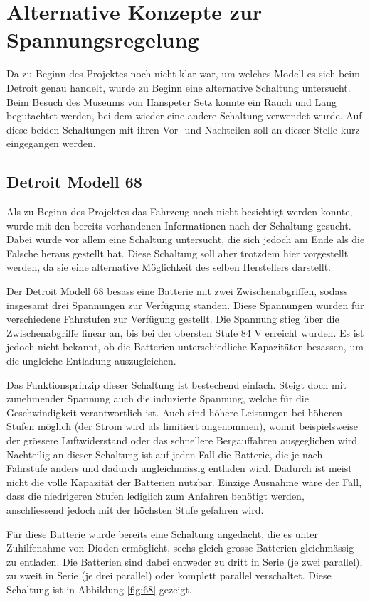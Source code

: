 \section{Alternative Konzepte zur Spannungsregelung}
Da zu Beginn des Projektes noch nicht klar war, um welches Modell es sich beim Detroit genau handelt, wurde zu Beginn eine alternative Schaltung untersucht. Beim Besuch des Museums von Hanspeter Setz konnte ein Rauch und Lang begutachtet werden, bei dem wieder eine andere Schaltung verwendet wurde. Auf diese beiden Schaltungen mit ihren Vor- und Nachteilen soll an dieser Stelle kurz eingegangen werden.

\subsection{Detroit Modell 68}
Als zu Beginn des Projektes das Fahrzeug noch nicht besichtigt werden konnte, wurde mit den bereits vorhandenen Informationen nach der Schaltung gesucht. Dabei wurde vor allem eine Schaltung untersucht, die sich jedoch am Ende als die Falsche heraus gestellt hat. Diese Schaltung soll aber trotzdem hier vorgestellt werden, da sie eine alternative Möglichkeit des selben Herstellers darstellt.

Der Detroit Modell 68 besass eine Batterie mit zwei Zwischenabgriffen, sodass insgesamt drei Spannungen zur Verfügung standen. Diese Spannungen wurden für verschiedene Fahrstufen zur Verfügung gestellt. Die Spannung stieg über die Zwischenabgriffe linear an, bis bei der obersten Stufe $84$ V erreicht wurden. Es ist jedoch nicht bekannt, ob die Batterien unterschiedliche Kapazitäten besassen, um die ungleiche Entladung auszugleichen.

Das Funktionsprinzip dieser Schaltung ist bestechend einfach. Steigt doch mit zunehmender Spannung auch die induzierte Spannung, welche für die Geschwindigkeit verantwortlich ist. Auch sind höhere Leistungen bei höheren Stufen möglich (der Strom wird als limitiert angenommen), womit beispielsweise der grössere Luftwiderstand oder das schnellere Bergauffahren ausgeglichen wird. Nachteilig an dieser Schaltung ist auf jeden Fall die Batterie, die je nach Fahrstufe anders und dadurch ungleichmässig entladen wird. Dadurch ist meist nicht die volle Kapazität der Batterien nutzbar. Einzige Ausnahme wäre der Fall, dass die niedrigeren Stufen lediglich zum Anfahren benötigt werden, anschliessend jedoch mit der höchsten Stufe gefahren wird.

Für diese Batterie wurde bereits eine Schaltung angedacht, die es unter Zuhilfenahme von Dioden ermöglicht, sechs gleich grosse Batterien gleichmässig zu entladen. Die Batterien sind dabei entweder zu dritt in Serie (je zwei parallel), zu zweit in Serie (je drei parallel) oder komplett parallel verschaltet. Diese Schaltung ist in Abbildung \ref{fig:68} gezeigt.

